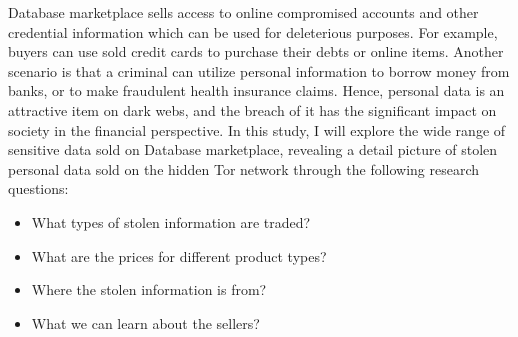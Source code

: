 Database marketplace sells access to online compromised accounts and other
credential information which can be used for deleterious purposes. For example,
buyers can use sold credit cards to purchase their debts or online items. Another
scenario is that a criminal can utilize personal information to borrow money from
banks, or to make fraudulent health insurance claims. Hence, personal data is
an attractive item on dark webs, and the breach of it has the significant impact
on society in the financial perspective. In this study, I will explore the wide
range of sensitive data sold on Database marketplace, revealing a detail picture
of stolen personal data sold on the hidden Tor network through the following research
questions:

\begin{itemize}
    \item What types of stolen information are traded?\label{rq:type}
    \item What are the prices for different product types?\label{rq:price}
    \item Where the stolen information is from?\label{rq:where}
    \item What we can learn about the sellers?\label{rq:seller}
\end{itemize}